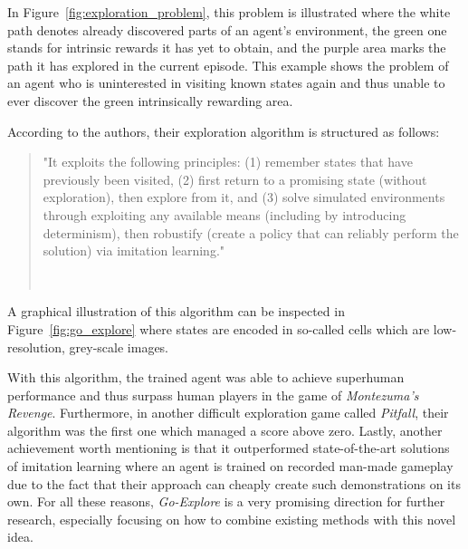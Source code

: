 \documentclass[draft,final]{vutinfth} %
\newcommand{\p}[1]{see p. #1}
\begin{document}
    \footnotetext{\citep[\p{3}]{ecoffet_go-explore_2019}}

    In Figure~\ref{fig:exploration_problem}, this problem is illustrated where the white path denotes already discovered parts of an agent's environment, the green one stands for intrinsic rewards it has yet to obtain, and the purple area marks the path it has explored in the current episode.
    This example shows the problem of an agent who is uninterested in visiting known states again and thus unable to ever discover the green intrinsically rewarding area.

    According to the authors, their exploration algorithm is structured as follows:


    \begin{quote}
        "It exploits the following principles: (1) remember states that have
        previously been visited, (2) first return to a promising state (without exploration),
        then explore from it, and (3) solve simulated environments through exploiting any
        available means (including by introducing determinism), then robustify (create a
        policy that can reliably perform the solution) via imitation learning."

        \hfill~\cite[\p{1}]{ecoffet_go-explore_2019}
    \end{quote}

    A graphical illustration of this algorithm can be inspected in Figure~\ref{fig:go_explore} where states are encoded in so-called cells which are low-resolution, grey-scale images.

    With this algorithm, the trained agent was able to achieve superhuman performance and thus surpass human players in the game of \textit{Montezuma's Revenge}.
    Furthermore, in another difficult exploration game called \textit{Pitfall}, their algorithm was the first one which managed a score above zero.
    Lastly, another achievement worth mentioning is that it outperformed state-of-the-art solutions of imitation learning where an agent is trained on recorded man-made gameplay due to the fact that their approach can cheaply create such demonstrations on its own.
    For all these reasons, \textit{Go-Explore} is a very promising direction for further research, especially focusing on how to combine existing methods with this novel idea.
\end{document}
